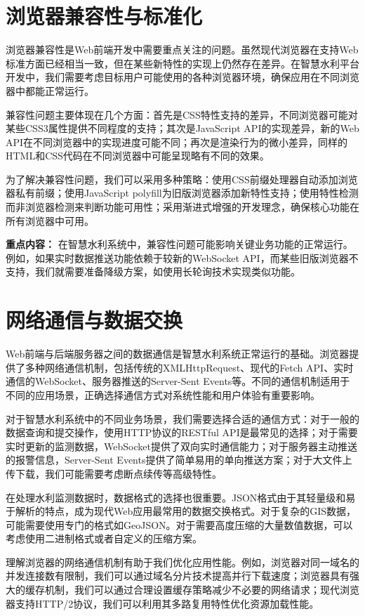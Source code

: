 \section{浏览器兼容性与标准化}

浏览器兼容性是Web前端开发中需要重点关注的问题。虽然现代浏览器在支持Web标准方面已经相当一致，但在某些新特性的实现上仍然存在差异。在智慧水利平台开发中，我们需要考虑目标用户可能使用的各种浏览器环境，确保应用在不同浏览器中都能正常运行。

兼容性问题主要体现在几个方面：首先是CSS特性支持的差异，不同浏览器可能对某些CSS3属性提供不同程度的支持；其次是JavaScript API的实现差异，新的Web API在不同浏览器中的实现进度可能不同；再次是渲染行为的微小差异，同样的HTML和CSS代码在不同浏览器中可能呈现略有不同的效果。

为了解决兼容性问题，我们可以采用多种策略：使用CSS前缀处理器自动添加浏览器私有前缀；使用JavaScript polyfill为旧版浏览器添加新特性支持；使用特性检测而非浏览器检测来判断功能可用性；采用渐进式增强的开发理念，确保核心功能在所有浏览器中可用。

\textbf{重点内容：} 在智慧水利系统中，兼容性问题可能影响关键业务功能的正常运行。例如，如果实时数据推送功能依赖于较新的WebSocket API，而某些旧版浏览器不支持，我们就需要准备降级方案，如使用长轮询技术实现类似功能。

\section{网络通信与数据交换}

Web前端与后端服务器之间的数据通信是智慧水利系统正常运行的基础。浏览器提供了多种网络通信机制，包括传统的XMLHttpRequest、现代的Fetch API、实时通信的WebSocket、服务器推送的Server-Sent Events等。不同的通信机制适用于不同的应用场景，正确选择通信方式对系统性能和用户体验有重要影响。

对于智慧水利系统中的不同业务场景，我们需要选择合适的通信方式：对于一般的数据查询和提交操作，使用HTTP协议的RESTful API是最常见的选择；对于需要实时更新的监测数据，WebSocket提供了双向实时通信能力；对于服务器主动推送的报警信息，Server-Sent Events提供了简单易用的单向推送方案；对于大文件上传下载，我们可能需要考虑断点续传等高级特性。

在处理水利监测数据时，数据格式的选择也很重要。JSON格式由于其轻量级和易于解析的特点，成为现代Web应用最常用的数据交换格式。对于复杂的GIS数据，可能需要使用专门的格式如GeoJSON。对于需要高度压缩的大量数值数据，可以考虑使用二进制格式或者自定义的压缩方案。

理解浏览器的网络通信机制有助于我们优化应用性能。例如，浏览器对同一域名的并发连接数有限制，我们可以通过域名分片技术提高并行下载速度；浏览器具有强大的缓存机制，我们可以通过合理设置缓存策略减少不必要的网络请求；现代浏览器支持HTTP/2协议，我们可以利用其多路复用特性优化资源加载性能。

